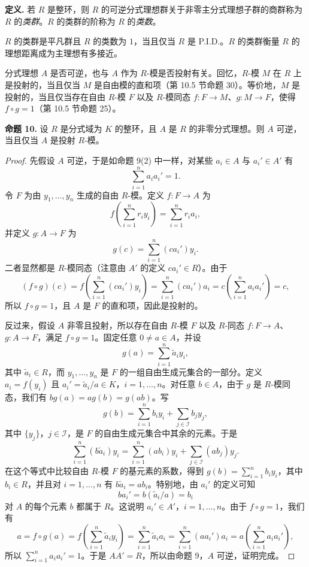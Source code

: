 \noindent\textbf{定义.} 若 $R$ 是整环，则 $R$ 的可逆分式理想群关于非零主分式理想子群的商群称为 $R$ 的\emph{类群}。$R$ 的类群的阶称为 $R$ 的\emph{类数}。

$R$ 的类群是平凡群且 $R$ 的类数为 $1$，当且仅当 $R$ 是 P.I.D.。$R$ 的类群衡量 $R$ 的理想距离成为主理想有多接近。

分式理想 $A$ 是否可逆，也与 $A$ 作为 $R$-模是否投射有关。回忆，$R$-模 $M$ 在 $R$ 上是投射的，当且仅当 $M$ 是自由模的直和项（第 10.5 节命题 30）。等价地，$M$ 是投射的，当且仅当存在自由 $R$-模 $F$ 以及 $R$-模同态 $f:F\to M$、$g:M\to F$，使得 $f\circ g=1$（第 10.5 节命题 25）。

\medskip
\noindent\textbf{命题 10.} 设 $R$ 是分式域为 $K$ 的整环，且 $A$ 是 $R$ 的非零分式理想。则 $A$ 可逆，当且仅当 $A$ 是投射 $R$-模。

\begin{proof}
先假设 $A$ 可逆，于是如命题 9(2) 中一样，对某些 $a_i\in A$ 与 $a_i'\in A'$ 有
\[
  \sum_{i=1}^n a_ia_i'=1.
\]
令 $F$ 为由 $y_1,
\ldots,y_n$ 生成的自由 $R$-模。定义 $f:F\to A$ 为
\[
  f\left(\sum_{i=1}^n r_iy_i\right)=\sum_{i=1}^n r_ia_i,
\]
并定义 $g:A\to F$ 为
\[
  g(c)=\sum_{i=1}^n(ca_i')y_i.
\]
二者显然都是 $R$-模同态（注意由 $A'$ 的定义 $ca_i'\in R$）。由于
\[
  (f\circ g)(c)=f\left(\sum_{i=1}^n(ca_i')y_i\right)
  =\sum_{i=1}^n(ca_i')a_i
  =c\left(\sum_{i=1}^n a_ia_i'\right)=c,
\]
所以 $f\circ g=1$，且 $A$ 是 $F$ 的直和项，因此是投射的。

反过来，假设 $A$ 非零且投射，所以存在自由 $R$-模 $F$ 以及 $R$-同态 $f:F\to A$、$g:A\to F$，满足 $f\circ g=1$。固定任意 $0\neq a\in A$，并设
\[
  g(a)=\sum_{i=1}^n \widetilde a_i y_i,
\]
其中 $\widetilde a_i\in R$，而 $y_1,
\ldots,y_n$ 是 $F$ 的一组自由生成元集合的一部分。定义 $a_i=f(y_i)$ 且 $a_i'=\widetilde a_i/a\in K$，$i=1,
\ldots,n$。对任意 $b\in A$，由于 $g$ 是 $R$-模同态，我们有 $bg(a)=ag(b)=g(ab)$。写
\[
  g(b)=\sum_{i=1}^n b_i y_i+\sum_{j\in\mathcal I}b_jy_j,
\]
其中 $\{y_j\}$，$j\in\mathcal I$，是 $F$ 的自由生成元集合中其余的元素。于是
\[
  \sum_{i=1}^n (b\widetilde a_i)y_i
  =\sum_{i=1}^n (ab_i)y_i+
  \sum_{j\in\mathcal I}(ab_j)y_j.
\]
在这个等式中比较自由 $R$-模 $F$ 的基元素的系数，得到 $g(b)=\sum_{i=1}^n b_iy_i$，其中 $b_i\in R$，并且对 $i=1,
\ldots,n$ 有 $b\widetilde a_i=ab_i$。特别地，由 $a_i'$ 的定义可知
\[
  ba_i'=b(\widetilde a_i/a)=b_i
\]
对 $A$ 的每个元素 $b$ 都属于 $R$。这说明 $a_i'\in A'$，$i=1,
\ldots,n$。由于 $f\circ g=1$，我们有
\[
  a=f\circ g(a)=f\left(\sum_{i=1}^n\widetilde a_i y_i\right)
  =\sum_{i=1}^n\widetilde a_i a_i
  =\sum_{i=1}^n(aa_i')a_i
  =a\left(\sum_{i=1}^n a_ia_i'\right),
\]
所以 $\sum_{i=1}^n a_ia_i'=1$。于是 $AA'=R$，所以由命题 9，$A$ 可逆，证明完成。
\end{proof}

